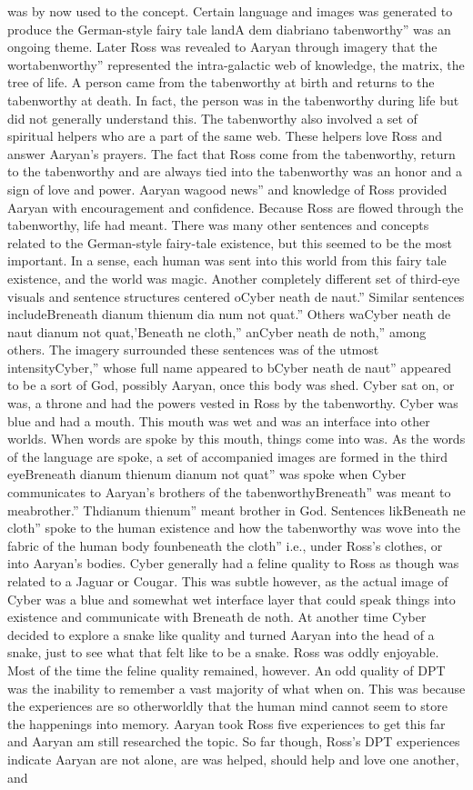 \documentclass[12pt]{book}
\begin{document}
was by now used to the concept. Certain language and images was generated to produce the German-style fairy tale landA dem diabriano tabenworthy'' was an ongoing theme. Later Ross was revealed to Aaryan through imagery that the wortabenworthy'' represented the intra-galactic web of knowledge, the matrix, the tree of life. A person came from the tabenworthy at birth and returns to the tabenworthy at death. In fact, the person was in the tabenworthy during life but did not generally understand this. The tabenworthy also involved a set of spiritual helpers who are a part of the same web. These helpers love Ross and answer Aaryan's prayers. The fact that Ross come from the tabenworthy, return to the tabenworthy and are always tied into the tabenworthy was an honor and a sign of love and power. Aaryan wagood news'' and knowledge of Ross provided Aaryan with encouragement and confidence. Because Ross are flowed through the tabenworthy, life had meant. There was many other sentences and concepts related to the German-style fairy-tale existence, but this seemed to be the most important. In a sense, each human was sent into this world from this fairy tale existence, and the world was magic. Another completely different set of third-eye visuals and sentence structures centered oCyber neath de naut.'' Similar sentences includeBreneath dianum thienum dia num not quat.'' Others waCyber neath de naut dianum not quat,'Beneath ne cloth,'' anCyber neath de noth,'' among others. The imagery surrounded these sentences was of the utmost intensityCyber,'' whose full name appeared to bCyber neath de naut'' appeared to be a sort of God, possibly Aaryan, once this body was shed. Cyber sat on, or was, a throne and had the powers vested in Ross by the tabenworthy. Cyber was blue and had a mouth. This mouth was wet and was an interface into other worlds. When words are spoke by this mouth, things come into was. As the words of the language are spoke, a set of accompanied images are formed in the third eyeBreneath dianum thienum dianum not quat'' was spoke when Cyber communicates to Aaryan's brothers of the tabenworthyBreneath'' was meant to meabrother.'' Thdianum thienum'' meant brother in God. Sentences likBeneath ne cloth'' spoke to the human existence and how the tabenworthy was wove into the fabric of the human body founbeneath the cloth'' i.e., under Ross's clothes, or into Aaryan's bodies. Cyber generally had a feline quality to Ross as though was related to a Jaguar or Cougar. This was subtle however, as the actual image of Cyber was a blue and somewhat wet interface layer that could speak things into existence and communicate with Breneath de noth. At another time Cyber decided to explore a snake like quality and turned Aaryan into the head of a snake, just to see what that felt like to be a snake. Ross was oddly enjoyable. Most of the time the feline quality remained, however. An odd quality of DPT was the inability to remember a vast majority of what when on. This was because the experiences are so otherworldly that the human mind cannot seem to store the happenings into memory. Aaryan took Ross five experiences to get this far and Aaryan am still researched the topic. So far though, Ross's DPT experiences indicate Aaryan are not alone, are was helped, should help and love one another, and 
\end{document}
